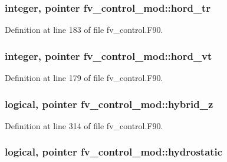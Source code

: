\subsubsection[{hord\-\_\-tr}]{\setlength{\rightskip}{0pt plus 5cm}integer, pointer fv\-\_\-control\-\_\-mod\-::hord\-\_\-tr\hspace{0.3cm}{\ttfamily [private]}}\label{classfv__control__mod_adb56058680af2238e44abdd8e8881782}


Definition at line 183 of file fv\-\_\-control.\-F90.

\subsubsection[{hord\-\_\-vt}]{\setlength{\rightskip}{0pt plus 5cm}integer, pointer fv\-\_\-control\-\_\-mod\-::hord\-\_\-vt\hspace{0.3cm}{\ttfamily [private]}}\label{classfv__control__mod_a8449a84c4d6a876356e036a171ee2b2c}


Definition at line 179 of file fv\-\_\-control.\-F90.

\subsubsection[{hybrid\-\_\-z}]{\setlength{\rightskip}{0pt plus 5cm}logical, pointer fv\-\_\-control\-\_\-mod\-::hybrid\-\_\-z\hspace{0.3cm}{\ttfamily [private]}}\label{classfv__control__mod_acabdc7dc9152ee3102b9d5e3f5b0c83d}


Definition at line 314 of file fv\-\_\-control.\-F90.

\subsubsection[{hydrostatic}]{\setlength{\rightskip}{0pt plus 5cm}logical, pointer fv\-\_\-control\-\_\-mod\-::hydrostatic\hspace{0.3cm}{\ttfamily [private]}}\label{classfv__control__mod_a253a9df8fc703d934789a380034b3124}



